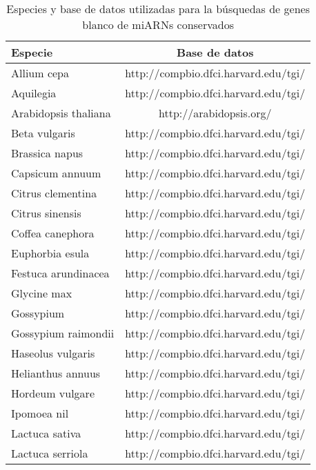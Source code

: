 \begin{table}[!htbp]
\footnotesize
\centering
\caption{Especies y base de datos utilizadas para la búsquedas de genes blanco de miARNs conservados}
\label{table:NAR_table_S2}
\begin{tabular}{lc}
Especie                         & \multicolumn{1}{c}{Base de datos}         \\
\hline 
Allium cepa                   & http://compbio.dfci.harvard.edu/tgi/ \\
Aquilegia                      & http://compbio.dfci.harvard.edu/tgi/ \\
Arabidopsis thaliana          & http://arabidopsis.org/              \\
Beta vulgaris                 & http://compbio.dfci.harvard.edu/tgi/ \\
Brassica napus                 & http://compbio.dfci.harvard.edu/tgi/ \\
Capsicum annuum               & http://compbio.dfci.harvard.edu/tgi/ \\
Citrus clementina             & http://compbio.dfci.harvard.edu/tgi/ \\
Citrus sinensis               & http://compbio.dfci.harvard.edu/tgi/ \\
Coffea canephora              & http://compbio.dfci.harvard.edu/tgi/ \\
Euphorbia esula               & http://compbio.dfci.harvard.edu/tgi/ \\
Festuca arundinacea           & http://compbio.dfci.harvard.edu/tgi/ \\
Glycine max                   & http://compbio.dfci.harvard.edu/tgi/ \\
Gossypium                      & http://compbio.dfci.harvard.edu/tgi/ \\
Gossypium raimondii           & http://compbio.dfci.harvard.edu/tgi/ \\
Haseolus vulgaris             & http://compbio.dfci.harvard.edu/tgi/ \\
Helianthus annuus             & http://compbio.dfci.harvard.edu/tgi/ \\
Hordeum vulgare               & http://compbio.dfci.harvard.edu/tgi/ \\
Ipomoea nil                   & http://compbio.dfci.harvard.edu/tgi/ \\
Lactuca sativa                & http://compbio.dfci.harvard.edu/tgi/ \\
Lactuca serriola              & http://compbio.dfci.harvard.edu/tgi/ \\

\end{tabular}
\end{table}
